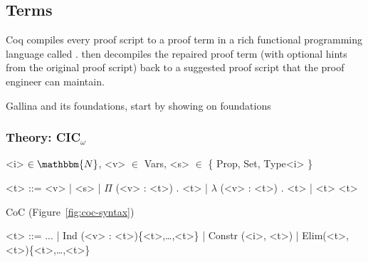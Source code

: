 \subsection{Terms}
\label{sec:mot-coq}

Coq compiles every proof script to a proof term in a rich functional programming language called .
\toolname then decompiles the repaired proof term (with optional hints from the original proof script) back 
to a suggested proof script that the proof engineer can maintain.

Gallina and its foundations, start by showing on foundations


\subsubsection{Theory: CIC$_{\omega}$}

\begin{figure*}
\small
\begin{grammar}
<i> $\in \mathbbm{N}$, <v> $\in$ Vars, <s> $\in$ \{ Prop, Set, Type<i> \}

<t> ::= <v> \hspace{0.06cm} | \hspace{0.06cm} <s> \hspace{0.06cm} | \hspace{0.06cm} $\Pi$ (<v> : <t>) . <t> \hspace{0.06cm} | \hspace{0.06cm} $\lambda$ (<v> : <t>) . <t> \hspace{0.06cm} | \hspace{0.06cm} <t> <t>
\end{grammar}
\vspace{-0.3cm}
\caption{Syntax for CoC$_\omega$ with (from left to right) variables, sorts, dependent types, functions, and application.}
\label{fig:coc-syntax}
\end{figure*}

CoC (Figure~\ref{fig:coc-syntax})

\begin{figure*}
\small
\begin{grammar}
<t> ::= ... | \hspace{0.06cm} Ind (<v> : <t>)\{<t>,\ldots,<t>\} \hspace{0.06cm} | \hspace{0.06cm} Constr (<i>, <t>) \hspace{0.06cm} | \hspace{0.06cm} Elim(<t>, <t>)\{<t>,\ldots,<t>\}
\end{grammar}
\vspace{-0.3cm}
\caption{CIC$_\omega$ is CoC$_\omega$ with inductive types, inductive constructors, and primitive eliminators.}
\label{fig:syntax}
\end{figure*}


